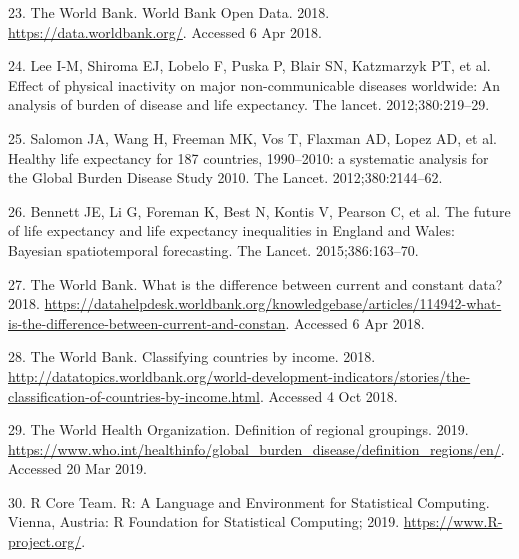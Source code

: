 \documentclass[]{elsarticle} %
\begin{document}
\leavevmode\hypertarget{ref-worldbank}{}%
23. The World Bank. World Bank Open Data. 2018. \url{https://data.worldbank.org/}. Accessed 6 Apr 2018.

\leavevmode\hypertarget{ref-lee2012effect}{}%
24. Lee I-M, Shiroma EJ, Lobelo F, Puska P, Blair SN, Katzmarzyk PT, et al. Effect of physical inactivity on major non-communicable diseases worldwide: An analysis of burden of disease and life expectancy. The lancet. 2012;380:219--29.

\leavevmode\hypertarget{ref-salomon2012healthy}{}%
25. Salomon JA, Wang H, Freeman MK, Vos T, Flaxman AD, Lopez AD, et al. Healthy life expectancy for 187 countries, 1990--2010: a systematic analysis for the Global Burden Disease Study 2010. The Lancet. 2012;380:2144--62.

\leavevmode\hypertarget{ref-bennett2015future}{}%
26. Bennett JE, Li G, Foreman K, Best N, Kontis V, Pearson C, et al. The future of life expectancy and life expectancy inequalities in England and Wales: Bayesian spatiotemporal forecasting. The Lancet. 2015;386:163--70.

\leavevmode\hypertarget{ref-worldbankconstant}{}%
27. The World Bank. What is the difference between current and constant data? 2018. \url{https://datahelpdesk.worldbank.org/knowledgebase/articles/114942-what-is-the-difference-between-current-and-constan}. Accessed 6 Apr 2018.

\leavevmode\hypertarget{ref-worldbankincome}{}%
28. The World Bank. Classifying countries by income. 2018. \url{http://datatopics.worldbank.org/world-development-indicators/stories/the-classification-of-countries-by-income.html}. Accessed 4 Oct 2018.

\leavevmode\hypertarget{ref-WHOregion}{}%
29. The World Health Organization. Definition of regional groupings. 2019. \url{https://www.who.int/healthinfo/global_burden_disease/definition_regions/en/}. Accessed 20 Mar 2019.

\leavevmode\hypertarget{ref-R353}{}%
30. R Core Team. R: A Language and Environment for Statistical Computing. Vienna, Austria: R Foundation for Statistical Computing; 2019. \url{https://www.R-project.org/}.
\end{document}
